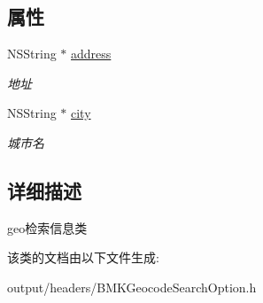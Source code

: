 \subsection*{属性}
\begin{DoxyCompactItemize}
\item 
\hypertarget{interface_b_m_k_geo_code_search_option_a8d27ba1022cbb8b24e0e4f7ab7ec8a46}{}N\+S\+String $\ast$ \hyperlink{interface_b_m_k_geo_code_search_option_a8d27ba1022cbb8b24e0e4f7ab7ec8a46}{address}\label{interface_b_m_k_geo_code_search_option_a8d27ba1022cbb8b24e0e4f7ab7ec8a46}

\begin{DoxyCompactList}\small\item\em 地址 \end{DoxyCompactList}\item 
\hypertarget{interface_b_m_k_geo_code_search_option_ad16f0f623de2a8a74114fb72b2844003}{}N\+S\+String $\ast$ \hyperlink{interface_b_m_k_geo_code_search_option_ad16f0f623de2a8a74114fb72b2844003}{city}\label{interface_b_m_k_geo_code_search_option_ad16f0f623de2a8a74114fb72b2844003}

\begin{DoxyCompactList}\small\item\em 城市名 \end{DoxyCompactList}\end{DoxyCompactItemize}


\subsection{详细描述}
geo检索信息类 

该类的文档由以下文件生成\+:\begin{DoxyCompactItemize}
\item 
output/headers/B\+M\+K\+Geocode\+Search\+Option.\+h\end{DoxyCompactItemize}
